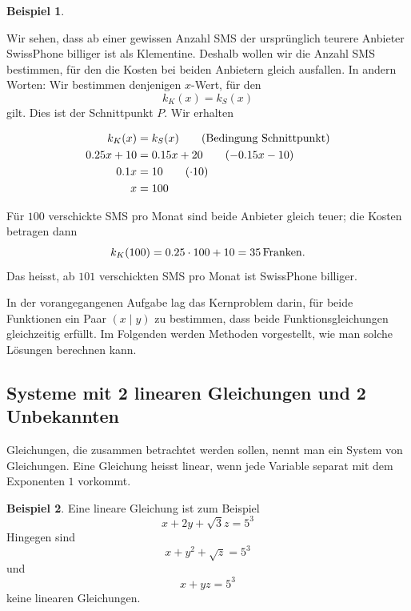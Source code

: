 \documentclass[%
11pt,%
twoside,%
titlepage,%
swissgerman,%
headsepline%
]{scrartcl}
\theoremstyle{definition}
\newtheorem{bsp}{Beispiel}[subsection] %
\theoremstyle{plain}
\begin{document}
\begin{bsp}
\begin{center}
{
}
\end{center}

Wir sehen, dass ab einer gewissen Anzahl SMS der ursprünglich teurere Anbieter SwissPhone billiger ist als Klementine. Deshalb wollen wir die Anzahl SMS bestimmen, für den die Kosten bei beiden Anbietern gleich ausfallen. In andern Worten: Wir bestimmen denjenigen $x$-Wert, für den
$$k_K(x)=k_S(x)$$
gilt. Dies ist der Schnittpunkt $P$.
Wir erhalten

\begin{align}
k_K(x)&=k_S(x)\tag{Bedingung Schnittpunkt}\\
0.25x+10&=0.15x+20\tag{$-0.15x-10$}\\
0.1x&=10\tag{$\cdot10$}\\
x&=100\notag
\end{align}

Für $100$ verschickte SMS pro Monat sind beide Anbieter gleich teuer; die Kosten betragen dann
$$k_K(100)=0.25\cdot100+10=\unit[35]{Franken}.$$
Das heisst, ab $101$ verschickten SMS pro Monat ist SwissPhone billiger.
\end{bsp}

In der vorangegangenen Aufgabe lag das Kernproblem darin, für beide Funktionen ein Paar $(x\mid y)$ zu bestimmen, dass beide Funktionsgleichungen gleichzeitig erfüllt. Im Folgenden werden Methoden vorgestellt, wie man solche Lösungen berechnen kann.

\subsection{Systeme mit 2 linearen Gleichungen und 2 Unbekannten}

Gleichungen, die zusammen betrachtet werden sollen, nennt man ein System von Gleichungen. Eine Gleichung heisst linear, wenn jede Variable separat mit dem Exponenten $1$ vorkommt.

\begin{bsp}
Eine lineare Gleichung ist zum Beispiel
$$x+2y+\sqrt{3}z=5^3$$
Hingegen sind
$$x+y^2+\sqrt{z}=5^3$$
und
$$x+yz=5^3$$
keine linearen Gleichungen.
\end{bsp}
\end{document}
